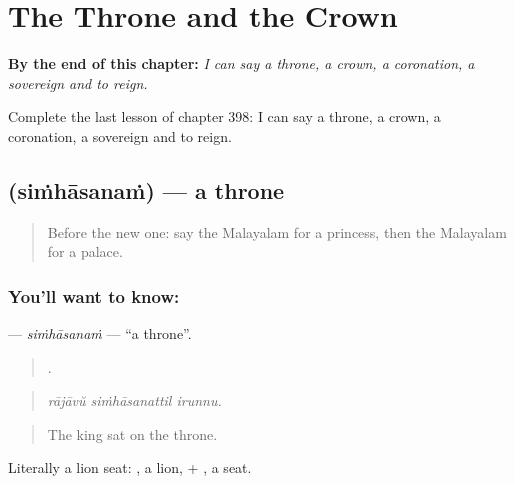 
\chapter{The Throne and the Crown}
\label{ch:ml-the-throne-and-the-crown}

\begin{chapteropening}
\textbf{By the end of this chapter:} \emph{I can say a throne, a crown, a coronation, a sovereign and to reign.}

Complete the last lesson of chapter 398: I can say a throne, a crown, a coronation, a sovereign and to reign.
\end{chapteropening}

\section[\texorpdfstring{\ml{സിംഹാസനം} (siṁhāsanaṁ)}{സിംഹാസനം (siṁhāsanaṁ)}]{ (siṁhāsanaṁ) — a throne}

\label{lesson:ML-C398-simhasanam}



\begin{quote}
Before the new one: say the Malayalam for a princess, then the Malayalam for a palace.
\end{quote}

\subsection*{You'll want to know: }
\textbf{} — \emph{siṁhāsanaṁ} — \textquotedblleft{}a throne\textquotedblright{}.

\begin{quote}
  .
\end{quote}

\begin{quote}
\emph{rājāvŭ siṁhāsanattil irunnu.}
\end{quote}

\begin{quote}
The king sat on the throne.
\end{quote}

Literally a lion seat: , a lion, + , a seat.


